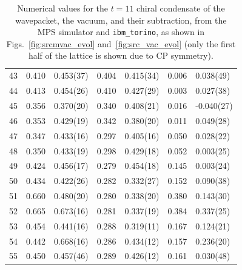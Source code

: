 \documentclass[aps, prc, tightenlines,superscriptaddress, letterpaper, amsmath, amssymb, preprintnumbers, floatfix, longbibliography, nofootinbib]{revtex4-2}
\begin{document}
\begin{table}[!htb]
{\begin{tabularx}{\textwidth}{| c || Y | Y | Y | Y | Y | Y |}
43	&	0.410	&	0.453(37)	&	0.404	&	0.415(34)	&	0.006	&	0.038(49)	\\
44	&	0.413	&	0.454(26)	&	0.410	&	0.427(29)	&	0.003	&	0.027(38)	\\
45	&	0.356	&	0.370(20)	&	0.340	&	0.408(21)	&	0.016	&	-0.040(27)	\\
46	&	0.353	&	0.429(19)	&	0.342	&	0.380(20)	&	0.011	&	0.049(28)	\\
47	&	0.347	&	0.433(16)	&	0.297	&	0.405(16)	&	0.050	&	0.028(22)	\\
48	&	0.350	&	0.433(19)	&	0.298	&	0.429(18)	&	0.052	&	0.003(25)	\\
49	&	0.424	&	0.456(17)	&	0.279	&	0.454(18)	&	0.145	&	0.003(24)	\\
50	&	0.434	&	0.422(26)	&	0.282	&	0.332(27)	&	0.152	&	0.090(38)	\\
51	&	0.660	&	0.480(20)	&	0.280	&	0.338(20)	&	0.380	&	0.143(30)	\\
52	&	0.665	&	0.673(16)	&	0.281	&	0.337(19)	&	0.384	&	0.337(25)	\\
53	&	0.454	&	0.441(16)	&	0.288	&	0.319(11)	&	0.167	&	0.124(21)	\\
54	&	0.442	&	0.668(16)	&	0.286	&	0.434(12)	&	0.157	&	0.236(20)	\\
55	&	0.450	&	0.457(46)	&	0.289	&	0.426(12)	&	0.161	&	0.030(48)	\\ \hline
\end{tabularx}}
\caption{Numerical values for the $t=11$ chiral condensate of the wavepacket, the vacuum, and their subtraction, from the MPS simulator and {\tt ibm\_torino}, as shown in Figs.~\ref{fig:srcmvac_evol} and~\ref{fig:src_vac_evol} (only the first half of the lattice is shown due to CP symmetry).}
 \label{tab:tablet11}
\end{table}
%
\end{document}
